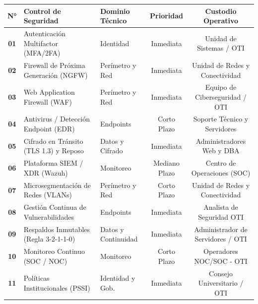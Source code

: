 \vspace{0.15cm}
\begin{center}
\scriptsize
\setlength{\tabcolsep}{4pt}
\renewcommand{\arraystretch}{1.15}
\begin{tabular}{cllcc}
\toprule
\rowcolor{outermarginbgcolor}
\textbf{N°} & \textbf{Control de Seguridad} & \textbf{Dominio Técnico} & \textbf{Prioridad} & \textbf{Custodio Operativo} \\
\midrule
\textbf{01} & Autenticación Multifactor (MFA/2FA) & Identidad & Inmediata & Unidad de Sistemas / OTI \\
\textbf{02} & Firewall de Próxima Generación (NGFW) & Perímetro y Red & Inmediata & Unidad de Redes y Conectividad \\
\textbf{03} & Web Application Firewall (WAF) & Perímetro y Red & Inmediata & Equipo de Ciberseguridad / OTI \\
\textbf{04} & Antivirus / Detección Endpoint (EDR) & Endpoints & Corto Plazo & Soporte Técnico y Servidores \\
\textbf{05} & Cifrado en Tránsito (TLS 1.3) y Reposo & Datos y Cifrado & Inmediata & Administradores Web y DBA \\
\textbf{06} & Plataforma SIEM / XDR (Wazuh) & Monitoreo & Mediano Plazo & Centro de Operaciones (SOC) \\
\textbf{07} & Microsegmentación de Redes (VLANs) & Perímetro y Red & Corto Plazo & Unidad de Redes y Conectividad \\
\textbf{08} & Gestión Continua de Vulnerabilidades & Endpoints & Inmediata & Analista de Seguridad OTI \\
\textbf{09} & Respaldos Inmutables (Regla 3-2-1-1-0) & Datos y Continuidad & Inmediata & Administrador de Servidores / OTI \\
\textbf{10} & Monitoreo Continuo (SOC / NOC) & Monitoreo & Corto Plazo & Operadores NOC/SOC - OTI \\
\textbf{11} & Políticas Institucionales (PSSI) & Identidad y Gob. & Inmediata & Consejo Universitario / OTI \\
\bottomrule
\end{tabular}
\label{tab:matriz_11_controles}
\end{center}